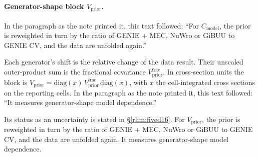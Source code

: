 \paragraph{Generator-shape block $V_{\mathrm{prior}}$.} In the paragraph as the note printed it, this text followed: ``For $C_{\mathrm{model}}$, the prior is reweighted in turn by the ratio of GENIE + MEC, NuWro or GiBUU to GENIE CV, and the data are unfolded again.''\par Each generator's shift is the relative change of the data result. Their unscaled outer-product sum is the fractional covariance $V_{\mathrm{prior}}^{\mathrm{frac}}$. In cross-section units the block is $V_{\mathrm{prior}}=\mathrm{diag}(x)\,V_{\mathrm{prior}}^{\mathrm{frac}}\,\mathrm{diag}(x)$, with $x$ the cell-integrated cross sections on the reporting cells. In the paragraph as the note printed it, this text followed: ``It measures generator-shape model dependence.''\par Its status as an uncertainty is stated in \S\ref{rlim:fived16}. For $V_{\mathrm{prior}}$, the prior is reweighted in turn by the ratio of GENIE + MEC, NuWro or GiBUU to GENIE CV, and the data are unfolded again. It measures generator-shape model dependence.
